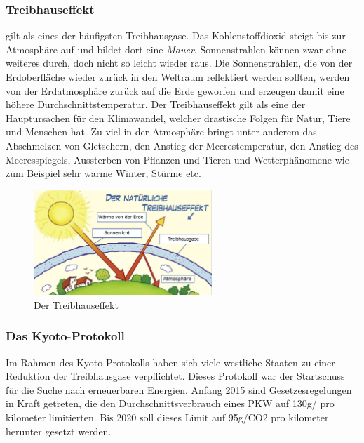\subsubsection{Treibhauseffekt}
 gilt als eines der häufigsten Treibhausgase.
Das Kohlenstoffdioxid steigt bis zur Atmosphäre auf und bildet dort eine \textit{Mauer}.
Sonnenstrahlen können zwar ohne weiteres durch, doch nicht so leicht wieder raus. Die Sonnenstrahlen,
die von der Erdoberfläche wieder zurück in den Weltraum reflektiert werden sollten, werden von der Erdatmosphäre zurück auf die Erde geworfen und erzeugen
damit eine höhere Durchschnittstemperatur.
Der Treibhauseffekt gilt als eine der Hauptursachen für den Klimawandel, welcher drastische Folgen für Natur, Tiere und Menschen hat. 
Zu viel  in der Atmosphäre bringt unter anderem das Abschmelzen von Gletschern, 
den Anstieg der Meerestemperatur, den Anstieg des Meeresspiegels, 
Aussterben von Pflanzen und Tieren und Wetterphänomene wie zum Beispiel sehr warme Winter, Stürme etc.

\begin{figure}[!htb]\centering
	\includegraphics[width=0.6\textwidth]{images/treibhaus1}
	\caption{Der Treibhauseffekt \cite{BOZH.ch1-co2-umwelt.treibhaus1}}
\end{figure}
 
\subsubsection{Das Kyoto-Protokoll}
Im Rahmen des Kyoto-Protokolls haben sich viele westliche Staaten zu einer Reduktion der Treibhausgase verpflichtet. 
Dieses Protokoll war der Startschuss für die Suche nach erneuerbaren Energien. 
Anfang 2015 sind Gesetzesregelungen in Kraft getreten, die den Durchschnittsverbrauch eines PKW auf 130g/ pro kilometer limitierten. 
Bis 2020 soll dieses Limit auf 95g/CO2 pro kilometer herunter gesetzt werden.

\clearpage
